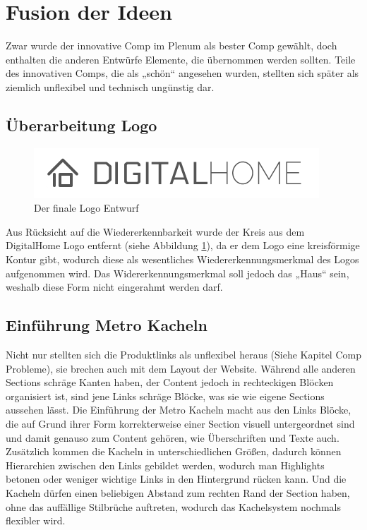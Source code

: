 \section{Fusion der Ideen}
Zwar wurde der innovative Comp im Plenum als bester Comp gewählt, doch enthalten die anderen Entwürfe Elemente, die übernommen werden sollten. Teile des innovativen Comps, die als „schön“ angesehen wurden, stellten sich später als ziemlich unflexibel und technisch ungünstig dar.
\subsection{Überarbeitung Logo}
\begin{figure} [tp]
\includegraphics[width=\textwidth]{./img/logo3.png}
\caption{Der finale Logo Entwurf}
\label{logo3}
\end{figure}
Aus Rücksicht auf die Wiedererkennbarkeit wurde der Kreis aus dem DigitalHome Logo entfernt (siehe Abbildung \ref{logo3}), da er dem Logo eine kreisförmige Kontur gibt, wodurch diese als wesentliches Wiedererkennungsmerkmal des Logos aufgenommen wird. Das Widererkennungsmerkmal soll jedoch das „Haus“ sein, weshalb diese Form nicht eingerahmt werden darf.

\subsection{Einführung Metro Kacheln}
Nicht nur stellten sich die Produktlinks als unflexibel heraus (Siehe Kapitel Comp Probleme), sie brechen auch mit dem Layout der Website. Während alle anderen Sections schräge Kanten haben, der Content jedoch in rechteckigen Blöcken organisiert ist, sind jene Links schräge Blöcke, was sie wie eigene Sections aussehen lässt. Die Einführung der Metro Kacheln macht aus den Links Blöcke, die auf Grund ihrer Form korrekterweise einer Section visuell untergeordnet sind und damit genauso zum Content gehören, wie Überschriften und Texte auch. Zusätzlich kommen die Kacheln in unterschiedlichen Größen, dadurch können Hierarchien zwischen den Links gebildet werden, wodurch man Highlights betonen oder weniger wichtige Links in den Hintergrund rücken kann. Und die Kacheln dürfen einen beliebigen Abstand zum rechten Rand der Section haben, ohne das auffällige Stilbrüche auftreten, wodurch das Kachelsystem nochmals flexibler wird.

